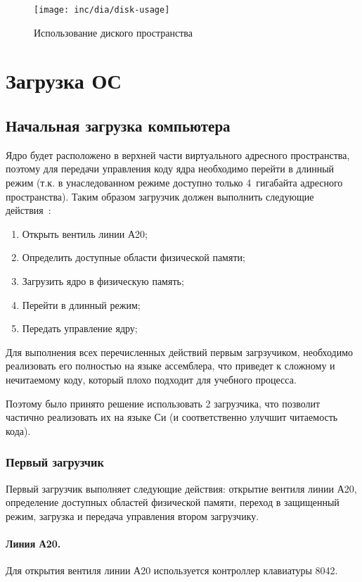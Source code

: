 \begin{figure}[ht!]
  \centering
  \texttt{[image: inc/dia/disk-usage]}
  \caption{Использование диского пространства}
  \label{fig:disk-usage}
\end{figure}


\section{Загрузка ОС}

\subsection{Начальная загрузка компьютера}
Ядро будет расположено в верхней части
виртуального адресного пространства, поэтому для передачи управления коду
ядра необходимо перейти в длинный режим (т.к. в унаследованном режиме доступно
только 4~гигабайта адресного пространства). Таким образом загрузчик должен
выполнить следующие действия~\cite{mstu_os_dev_method}:
\begin{enumerate}[1.]
\item Открыть вентиль линии А20;
\item Определить доступные области физической памяти;
\item Загрузить ядро в физическую память;
\item Перейти в длинный режим;
\item Передать управление ядру;
\end{enumerate}

Для выполнения всех перечисленных действий первым загрзучиком, необходимо реализовать
его полностью на языке ассемблера, что приведет к сложному и нечитаемому коду, который
плохо подходит для учебного процесса.

Поэтому было принято решение использовать 2 загрузчика, что позволит частично реализовать
их на языке Си (и соответственно улучшит читаемость кода).

\subsubsection*{Первый загрузчик}
Первый загрузчик выполняет следующие действия: открытие вентиля линии А20, определение доступных
областей физической памяти, переход в защищенный режим, загрузка и передача управления
втором загрузчику.

\paragraph{Линия А20.} Для открытия вентиля линии А20 используется контроллер клавиатуры 8042.

